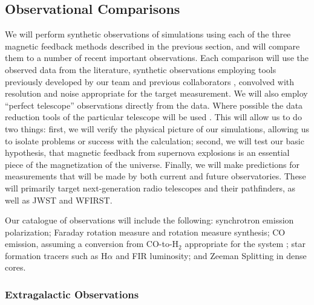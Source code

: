 \vspace{-3mm}
\subsection{Observational Comparisons}
\label{sec:observational_comps}
\vspace{-2mm}

We will perform synthetic observations of simulations using each of the
three magnetic feedback methods described in the previous section, and
will compare them
to a number of recent important observations.  Each comparison will use the
observed data from the literature, synthetic observations employing tools previously
developed by our team and previous collaborators
\citep[e.g.,][]{2013ApJ...765...21S,Barrow17,Barrow17_FL2}, convolved with
resolution and noise appropriate for the target measurement.  We will also
employ ``perfect telescope'' observations directly from the data.  Where
possible the data reduction tools of the particular telescope will be used \citep[e.g.,
CASA; ][]{McMullin07}.
This will allow us to do two things: first, we will verify the physical picture of
our simulations, allowing us to isolate problems or
success with the calculation; second, we will test our basic hypothesis, that
magnetic feedback from supernova explosions is an essential piece of the
magnetization of the universe.  Finally, we will make
predictions for measurements that will be made by both current and
future observatories.  These will primarily target next-generation radio
telescopes and their pathfinders, as well as JWST and WFIRST.

Our catalogue of observations will include the following: synchrotron emission
polarization; Faraday rotation measure and rotation measure synthesis; CO
emission, assuming a conversion from CO-to-H$_2$ appropriate for the system
\citet[e.g.][]{Genzel12,Clark15}; star
formation tracers such as H$\alpha$ and FIR luminosity; and Zeeman Splitting in
dense cores.

\vspace{-3mm}
\subsubsection{Extragalactic Observations}
\vspace{-2mm}

